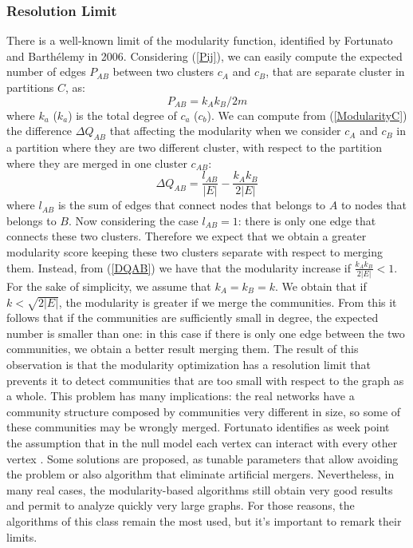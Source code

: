 \subsubsection{Resolution Limit}
There is a well-known limit of the modularity function, identified by Fortunato and Barthélemy \cite{resolution-limit} in 2006. Considering (\ref{Pij}), we can easily compute the expected number of edges $P_{AB}$ between two clusters $c_A$ and $c_B$, that are separate cluster in partitions $C$, as:
\begin{equation}
P_{AB} = k_A k_B /2m 
\end{equation}
where $k_a$ ($k_a$) is the total degree of $c_a$ ($c_b$).
We can compute from (\ref{ModularityC}) the difference $\Delta Q_{AB}$ that affecting the modularity when we consider $c_A$ and $c_B$ in a partition where they are two different cluster, with respect to the partition where they are merged in one cluster $c_{AB}$:
\begin{equation}\label{DQAB}
\Delta Q_{AB} = \frac{l_{AB}}{|E|}  - \frac{k_Ak_B}{2|E|}
\end{equation}
where $l_{AB}$ is the sum of edges that connect nodes that belongs to $A$ to nodes that belongs to $B$.
Now considering the case $l_{AB} = 1$: there is only one edge that connects these two clusters. Therefore we expect that we obtain a greater modularity score keeping these two clusters separate with respect to merging them. Instead, from (\ref{DQAB}) we have that the modularity increase if  $\frac{k_Ak_B}{2|E|} < 1$. For the sake of simplicity, we assume that $k_A = k_B = k$. We obtain that if $k < \sqrt{2|E|}$, the modularity is greater if we merge the communities. From this it follows that if the communities are sufficiently small in degree, the expected number is smaller than one: in this case if there is only one edge between the two communities, we obtain a better result merging them. The result of this observation is that the modularity optimization has a resolution limit that prevents it to detect communities that are too small with respect to the graph as a whole.
This problem has many implications: the real networks have a community structure composed by communities very different in size, so some of these communities may be wrongly merged. Fortunato identifies as week point the assumption that in the null model each vertex can interact with every other vertex \cite{fortunato}. Some solutions are proposed, as tunable parameters that allow avoiding the problem or also algorithm that eliminate artificial mergers. Nevertheless, in many real cases, the modularity-based algorithms still obtain very good results and permit to analyze quickly very large graphs. For those reasons, the algorithms of this class remain the most used, but it's important to remark their limits.

